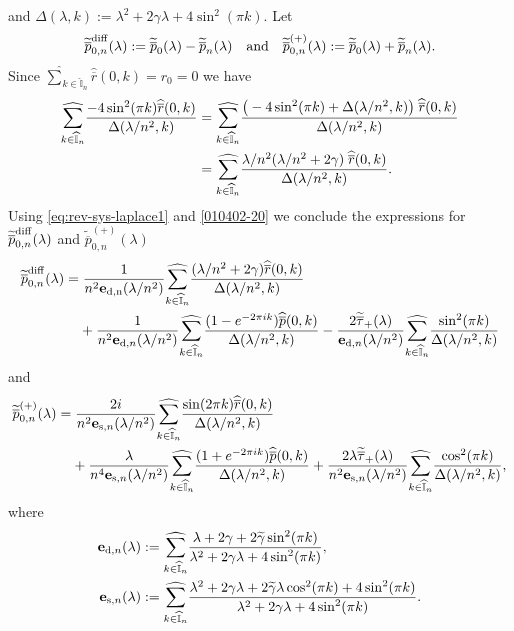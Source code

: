 \documentclass[EJP]{ejpecp} %
\newcommand\T{{\mathbb I}}
\newcommand \ga{\gamma}
\newcommand \la{\lambda}
\renewcommand{\hat}{\widehat}
\renewcommand{\tilde}{\widetilde}
\renewcommand{\bar}{\overline}
\numberwithin{equation}{section}
\begin{document}
and
$
\Delta(\la,k):=\la^2+2\ga \la+4\sin^2(\pi k).
$
Let
$$
\tilde{\bar p}^{\rm diff}_{0,n}(\la):=\tilde{\bar p}_{0}(\la)-\tilde{\bar
  p}_{n}(\la)\quad\mbox{and}\quad \tilde{\bar p}_{0,n}^{(+)}(\la):=\tilde{\bar p}_{0}(\la)+\tilde{\bar
  p}_{n}(\la).
$$
Since
${\hat\sum}_{k\in \widehat{\T}_n}\widehat{\bar
    r}(0,k)=r_0=0$ we have
\begin{align}
\label{010402-20}
\underset{{k\in \widehat{\T}_n}}{{\hat\sum}}\frac{-4\sin^2(\pi k)\widehat{\bar
    r}(0,k)}{\Delta(\la/n^2,k)}& =\underset{{k\in \widehat{\T}_n}}{{\hat\sum}}\frac{\big(-4\sin^2(\pi k)+\Delta(\la/n^2,k)\big)\;\widehat{\bar
    r}(0,k)}{\Delta(\la/n^2,k)}\notag\\
&
=\underset{{k\in \widehat{\T}_n}}{{\hat\sum}}\frac{\la/n^2 (\la/n^2+2\ga)\;\widehat{\bar
    r}(0,k)}{\Delta(\la/n^2,k)}.
\end{align} 
Using \eqref{eq:rev-sys-laplace1} and
\eqref{010402-20}  we conclude the expressions
for $\tilde{\bar p}^{\rm diff}_{0,n}(\la)$ and $\tilde{\bar p}_{0,n}^{(+)}(\la)$
\begin{align}
  \label{eq:diff}
  \tilde{\bar p}^{\rm diff}_{0,n}(\la)
   = & \; \frac{1}{n^2  \mathbf{e}_{\rm d,n}(\la/n^2)}\underset{{k\in \widehat{\T}_n}}{{\hat\sum}}\frac{ (\la/n^2+2\ga)\widehat{\bar
    r}(0,k)}{\Delta(\la/n^2,k)}\\&+\frac{1}{ n^2  \mathbf{e}_{{\rm d},n}(\la/n^2)}\underset{{k\in \widehat{\T}_n}}{{\hat\sum}}\frac{(1-e^{-2\pi
    i k})\widehat{\bar p}(0,k)}{\Delta(\la/n^2,k)}\notag
- \frac{2 \tilde{\bar
    \tau}_+(\la)}{   \mathbf{e}_{{\rm d},n}(\la/n^2)}\underset{{k\in \widehat{\T}_n}}{{\hat\sum}}\frac{\sin^2(\pi k)}{\Delta(\la/n^2,k)}
\end{align}
and
\begin{align}
  \label{eq:sum}
 \tilde{\bar p}^{(+)}_{0,n}(\la)
   =& \;\frac{2i}{n^2 \mathbf{e}_{{\rm s},n}(\la/n^2)}\underset{{k\in \widehat{\T}_n}}{{\hat\sum}}\frac{\sin(2\pi k)\widehat{\bar
    r}(0,k)}{\Delta(\la/n^2,k)} \\&
+\frac{\la}{n^4 \mathbf{e}_{{\rm s},n}(\la/n^2)}\underset{{k\in \widehat{\T}_n}}{{\hat\sum}}\frac{(1+e^{-2\pi i k}) \widehat{\bar p}(0,k)}{\Delta(\la/n^2,k)}
 +\frac{2\la \tilde{\bar
    \tau}_+(\la) }{n^2 \mathbf{e}_{{\rm s},n}(\la/n^2)}\underset{{k\in \widehat{\T}_n}}{{\hat\sum}}\frac{\cos^2(\pi k)}{\Delta(\la/n^2,k)}, \notag
  \end{align}
where
\begin{align*}
 \mathbf{e}_{{\rm d},n}(\la)&:=\underset{{k\in \widehat{\T}_n}}{{\hat\sum}}\frac{\la+2\ga+2 \tilde\ga\sin^2(\pi
  k)}{\la^2 +2\ga\la +4\sin^2(\pi
  k)},\\
 \mathbf{e}_{{\rm s},n}(\la) &:
=\underset{{k\in \widehat{\T}_n}}{{\hat\sum}}\frac{\la^2+2\ga
 \la+2 \tilde\ga \la\cos^2(\pi k)+4\sin^2(\pi
  k)}{\la^2+2\ga\la +4\sin^2(\pi k)}.
\end{align*}
\end{document}
